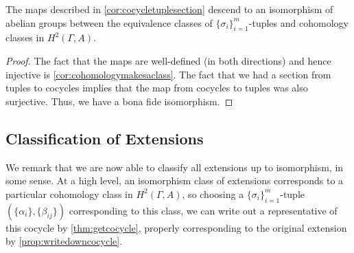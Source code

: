 \documentclass{article}
\numberwithin{equation}{section}
\begin{document}
\begin{theorem} \label{thm:classisomorphism}
	The maps described in \autoref{cor:cocycletuplesection} descend to an isomorphism of abelian groups between the equivalence classes of $\{\sigma_i\}_{i=1}^m$-tuples and cohomology classes in $H^2(\Gamma,A)$.
\end{theorem}
\begin{proof}
	The fact that the maps are well-defined (in both directions) and hence injective is \autoref{cor:cohomologymakesaclass}. The fact that we had a section from tuples to cocycles implies that the map from cocycles to tuples was also surjective. Thus, we have a bona fide isomorphism.
\end{proof}

\subsection{Classification of Extensions}
We remark that we are now able to classify all extensions up to isomorphism, in some sense. At a high level, an isomorphism class of extensions corresponds to a particular cohomology class in $H^2(\Gamma,A)$, so choosing a $\{\sigma_i\}_{i=1}^m$-tuple $(\{\alpha_i\},\{\beta_{ij}\})$ corresponding to this class, we can write out a representative of this cocycle by \autoref{thm:getcocycle}, properly corresponding to the original extension by \autoref{prop:writedowncocycle}.
\end{document}
